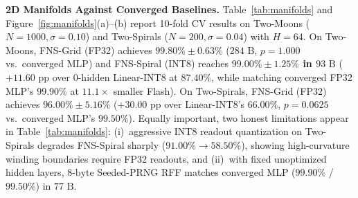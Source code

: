 \textbf{2D Manifolds Against Converged Baselines.} Table~\ref{tab:manifolds} and Figure~\ref{fig:manifolds}(a)--(b) report 10-fold CV results on Two-Moons ($N=1000, \sigma=0.10$) and Two-Spirals \cite{lang1988learning} ($N=200, \sigma=0.04$) with $H=64$. On Two-Moons, FNS-Grid (FP32) achieves $99.80\%\pm 0.63\%$ ($284\text{ B}$, $p=1.000$ vs.\ converged MLP) and FNS-Spiral (INT8) reaches \textbf{$99.00\%\pm 1.25\%$ in $93\text{ B}$} ($+11.60$ pp over $0\text{-hidden}$ Linear-INT8 at $87.40\%$, while matching converged FP32 MLP's $99.90\%$ at $11.1\times$ smaller Flash). On Two-Spirals, FNS-Grid (FP32) achieves $96.00\%\pm 5.16\%$ ($+30.00$ pp over Linear-INT8's $66.00\%$, $p=0.0625$ vs.\ converged MLP's $99.50\%$). Equally important, two honest limitations appear in Table~\ref{tab:manifolds}: (i)~aggressive INT8 readout quantization on Two-Spirals degrades FNS-Spiral sharply ($91.00\% \to 58.50\%$), showing high-curvature winding boundaries require FP32 readouts, and (ii)~with fixed unoptimized hidden layers, $8\text{-byte}$ Seeded-PRNG RFF matches converged MLP ($99.90\%$ / $99.50\%$) in $77\text{ B}$.


